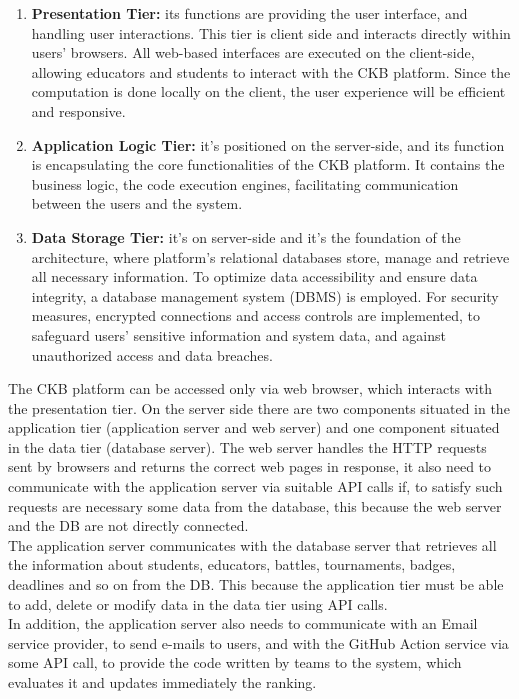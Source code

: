 \begin{enumerate}
    \item \textbf{Presentation Tier:} its functions are providing the user interface, and handling user interactions. This tier is client side and interacts directly within users' browsers. All web-based interfaces are executed on the client-side, allowing educators and students to interact with the CKB platform. Since the computation is done locally on the client, the user experience will be efficient and responsive.
    \item \textbf{Application Logic Tier:} it’s positioned on the server-side, and its function is encapsulating the core functionalities of the CKB platform.  It contains the business logic, the code execution engines, facilitating communication between the users and the system. 
    \item \textbf{Data Storage Tier:} it's on server-side and it's the foundation of the architecture, where platform’s relational databases store, manage and retrieve all necessary information. To optimize data accessibility and ensure data integrity, a database management system (DBMS) is employed. For security measures, encrypted connections and access controls are implemented, to safeguard users’ sensitive information and system data, and against unauthorized access and data breaches.
\end{enumerate}
The CKB platform can be accessed only via web browser, which interacts with the presentation tier. On the server side there are two components situated in the application tier (application server and web server) and one component situated in the data tier (database server). The web server handles the HTTP requests sent by browsers and returns the correct web pages in response, it also need to communicate with the application server via suitable API calls if, to satisfy such requests are necessary some data from the database, this because the web server and the DB are not directly connected.\\
The application server communicates with the database server that retrieves all the information about students, educators, battles, tournaments, badges, deadlines and so on from the DB. This because the application tier must be able to add, delete or modify data in the data tier using API calls. \\
In addition, the application server also needs to communicate with an Email service provider, to send e-mails to users, and with the GitHub Action service via some API call, to provide the code written by teams to the system, which evaluates it and updates immediately the ranking.\\
